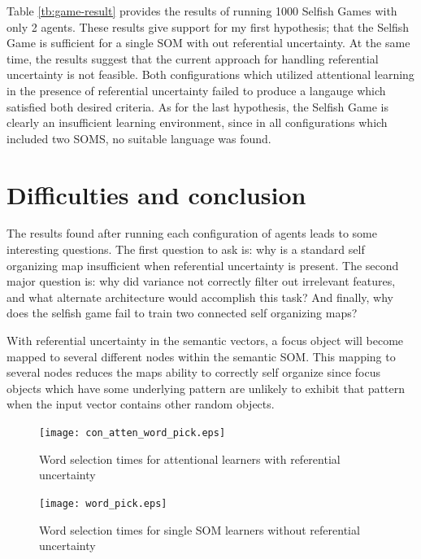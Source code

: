 \documentclass[a4paper,11pt]{article}
\begin{document}
Table \ref{tb:game-result} provides the results of running 1000 Selfish Games
with only 2 agents.  These results give support for my first hypothesis; that
the Selfish Game is sufficient for a single SOM with out referential
uncertainty.  At the same time, the results suggest that the current approach
for handling referential uncertainty is not feasible.  Both configurations which
utilized attentional learning in the presence of referential uncertainty
failed to produce a langauge which satisfied both desired criteria.  As for
the last hypothesis, the Selfish Game is clearly an insufficient learning
environment, since in all configurations which included two SOMS, no suitable
language was found.  

\section{Difficulties and conclusion}

The results found after running each configuration of agents leads to some
interesting questions.  The first question to ask is: why is a standard self
organizing map insufficient when referential uncertainty is present.  The second
major question is: why did variance not correctly filter out irrelevant
features, and what alternate architecture would accomplish this task?  And
finally, why does the selfish game fail to train two connected self organizing
maps?  

With referential uncertainty in the semantic vectors, a focus object will become
mapped to several different nodes within the semantic SOM.  This mapping to
several nodes reduces the maps ability to correctly self organize since focus
objects which have some underlying pattern are unlikely to exhibit that pattern
when the input vector contains other random objects.

\begin{figure}
\texttt{[image: con\_atten\_word\_pick.eps]}
\caption{Word selection times for attentional learners with referential
uncertainty} \label{fig:cont_atten_word_pick}
\end{figure}

\begin{figure}
\texttt{[image: word\_pick.eps]}
\caption{Word selection times for single SOM learners without referential
uncertainty} \label{fig:word_pick}
\end{figure}
\end{document}
